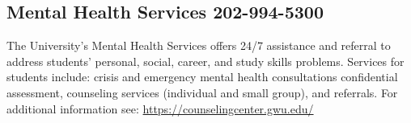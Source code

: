 \documentclass[pdftex,11pt]{artikel3}
\begin{document}
\subsection{Mental Health Services 202-994-5300}
The University's Mental Health Services offers 24/7 assistance and referral to address students' personal, social, career, and study skills problems. Services for students include: crisis and emergency mental health consultations confidential assessment, counseling services (individual and small group), and referrals. For additional information see: \url{https://counselingcenter.gwu.edu/}


\newpage

\end{document}
